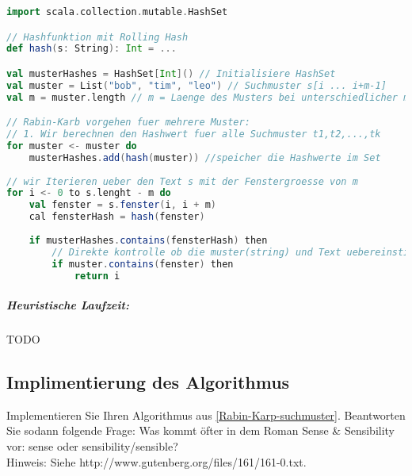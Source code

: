 \begin{lstlisting}[language=Scala]
import scala.collection.mutable.HashSet

// Hashfunktion mit Rolling Hash 
def hash(s: String): Int = ...

val musterHashes = HashSet[Int]() // Initialisiere HashSet
val muster = List("bob", "tim", "leo") // Suchmuster s[i ... i+m-1]
val m = muster.length // m = Laenge des Musters bei unterschiedlicher musterlaenge sollte m die wenigsten charaktere haben

// Rabin-Karb vorgehen fuer mehrere Muster:
// 1. Wir berechnen den Hashwert fuer alle Suchmuster t1,t2,...,tk
for muster <- muster do
	musterHashes.add(hash(muster)) //speicher die Hashwerte im Set
	
// wir Iterieren ueber den Text s mit der Fenstergroesse von m
for i <- 0 to s.lenght - m do
	val fenster = s.fenster(i, i + m)
	cal fensterHash = hash(fenster)
	
	if musterHashes.contains(fensterHash) then
		// Direkte kontrolle ob die muster(string) und Text uebereinstimmen
		if muster.contains(fenster) then
			return i
\end{lstlisting}

\subparagraph{Heuristische Laufzeit:}\alert{TODO}



\subsection{Implimentierung des Algorithmus}
Implementieren Sie Ihren Algorithmus aus \ref{Rabin-Karp-suchmuster}. Beantworten Sie sodann folgende Frage: Was kommt öfter in dem Roman Sense \& Sensibility vor: sense oder sensibility/sensible?\\
Hinweis: Siehe http://www.gutenberg.org/files/161/161-0.txt.


